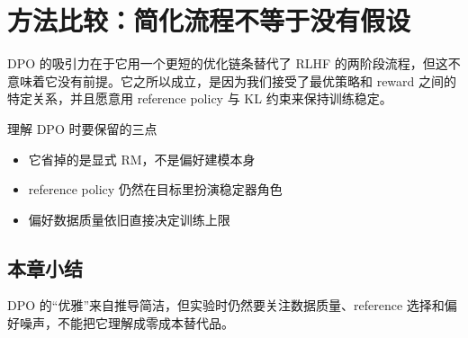 \section{方法比较：简化流程不等于没有假设}
DPO 的吸引力在于它用一个更短的优化链条替代了 RLHF 的两阶段流程，但这不意味着它没有前提。它之所以成立，是因为我们接受了最优策略和 reward 之间的特定关系，并且愿意用 reference policy 与 KL 约束来保持训练稳定。

\begin{knowledgebox}{理解 DPO 时要保留的三点}
\begin{itemize}
  \item 它省掉的是显式 RM，不是偏好建模本身
  \item reference policy 仍然在目标里扮演稳定器角色
  \item 偏好数据质量依旧直接决定训练上限
\end{itemize}
\end{knowledgebox}

\subsection{本章小结}
DPO 的“优雅”来自推导简洁，但实验时仍然要关注数据质量、reference 选择和偏好噪声，不能把它理解成零成本替代品。

\newpage
